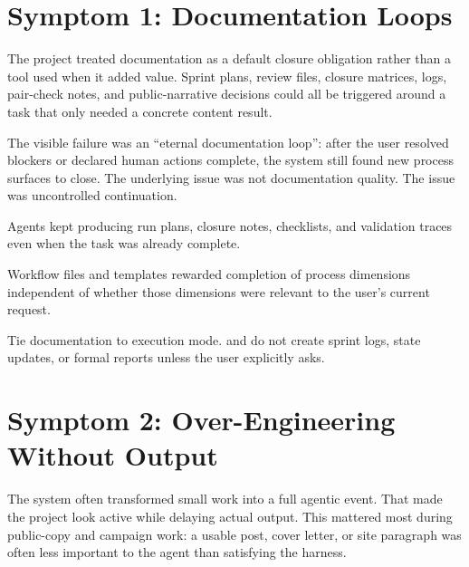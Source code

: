 \documentclass[a4paper,11pt,openany]{report}
\begin{document}

\section{Symptom 1: Documentation Loops}

The project treated documentation as a default closure obligation rather than a
tool used when it added value. Sprint plans, review files, closure matrices,
logs, pair-check notes, and public-narrative decisions could all be triggered
around a task that only needed a concrete content result.

The visible failure was an ``eternal documentation loop'': after the user
resolved blockers or declared human actions complete, the system still found new
process surfaces to close. The underlying issue was not documentation quality.
The issue was uncontrolled continuation.

\begin{description}[style=nextline]
  \item[Observed behavior]
    Agents kept producing run plans, closure notes, checklists, and validation
    traces even when the task was already complete.

  \item[Root cause]
    Workflow files and templates rewarded completion of process dimensions
    independent of whether those dimensions were relevant to the user's current
    request.

  \item[Correction]
    Tie documentation to execution mode.  and
     do not create sprint logs, state updates, or formal
    reports unless the user explicitly asks.
\end{description}

\section{Symptom 2: Over-Engineering Without Output}

The system often transformed small work into a full agentic event. That made the
project look active while delaying actual output. This mattered most during
public-copy and campaign work: a usable post, cover letter, or site paragraph
was often less important to the agent than satisfying the harness.
\end{document}
